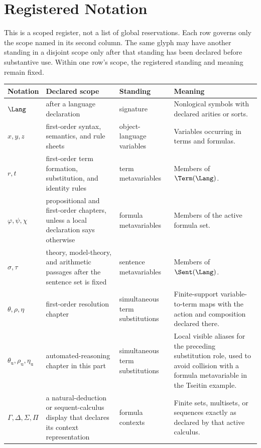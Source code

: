 \appendix

\chapter{Registered Notation}
\label{ch:registered-notation}
\label{app:notation}

This is a scoped register, not a list of global reservations.  Each row governs
only the scope named in its second column.  The same glyph may have another
standing in a disjoint scope only after that standing has been declared before
substantive use.  Within one row's scope, the registered standing and meaning
remain fixed.

\begin{longtable}{@{}p{}p{}p{}p{}@{}}
\toprule
Notation & Declared scope & Standing & Meaning \\
\midrule
\endhead
\(\Lang\) & after a language declaration & signature & Nonlogical symbols with
declared arities or sorts. \\
\(x,y,z\) & first-order syntax, semantics, and rule sheets & object-language
variables & Variables occurring in terms and formulas. \\
\(r,t\) & first-order term formation, substitution, and identity rules & term
metavariables & Members of \(\Term(\Lang)\). \\
\(\varphi,\psi,\chi\) & propositional and first-order chapters, unless a local
declaration says otherwise & formula metavariables & Members of the active
formula set. \\
\(\sigma,\tau\) & theory, model-theory, and arithmetic passages after the
sentence set is fixed & sentence metavariables & Members of
\(\Sent(\Lang)\). \\
\(\theta,\rho,\eta\) & first-order resolution chapter & simultaneous term
substitutions & Finite-support variable-to-term maps with the action and
composition declared there. \\
\(\theta_{\mathrm u},\rho_{\mathrm u},\eta_{\mathrm u}\) & automated-reasoning
chapter in this part & simultaneous term substitutions & Local visible aliases
for the preceding substitution role, used to avoid collision with a formula
metavariable in the Tseitin example. \\
\(\Gamma,\Delta,\Sigma,\Pi\) & a natural-deduction or sequent-calculus display
that declares its context representation & formula contexts & Finite sets,
multisets, or sequences exactly as declared by that active calculus. \\

\end{longtable}
